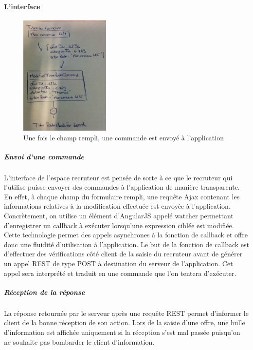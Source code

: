 \paragraph{L'interface}
\label{par:L'interface}
\begin{figure}[h]
  \begin{center}
    \includegraphics[width=0.4\textwidth]{Pictures/EventSourcing/gestion_command.jpg}
    \caption{Une fois le champ rempli, une commande est envoyé à l'application}
  \end{center}
\end{figure}
\subparagraph{Envoi d'une commande}
\label{subp:Envoi d'une commande}
L'interface de l'espace recruteur est pensée de sorte à ce que le recruteur qui l'utilise puisse envoyer des commandes à l'application de manière transparente.
En effet, à chaque champ du formulaire rempli, une requête Ajax contenant les informations relatives à la modification effectuée est envoyée à l'application.
Concrètement, on utilise un élément d'AngularJS appelé watcher permettant d'enregistrer un callback à exécuter lorsqu'une expression ciblée est modifiée.
Cette technologie permet des appels asynchrones à la fonction de callback et offre donc une fluidité d'utilisation à l'application.
Le but de la fonction de callback est d'effectuer des vérifications côté client de la saisie du recruteur avant de générer un appel REST de type POST à destination du serveur de l'application.
Cet appel sera interprété et traduit en une commande que l'on tentera d'exécuter.
\subparagraph{Réception de la réponse}
\label{subp:Réception de la réponse}
La réponse retournée par le serveur après une requête REST permet d'informer le client de la bonne réception de son action.
Lors de la saisie d'une offre, une bulle d'information est affichée uniquement si la réception s'est mal passée puisqu'on ne souhaite pas bombarder le client d'information.
